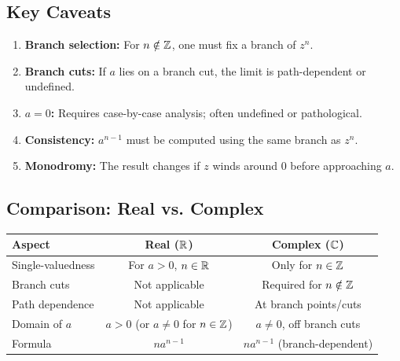 \subsection{Key Caveats}

\begin{enumerate}
    \item \textbf{Branch selection:} For $n \notin \mathbb{Z}$, one must fix a branch of $z^n$.
    \item \textbf{Branch cuts:} If $a$ lies on a branch cut, the limit is path-dependent or undefined.
    \item \textbf{$a = 0$:} Requires case-by-case analysis; often undefined or pathological.
    \item \textbf{Consistency:} $a^{n-1}$ must be computed using the same branch as $z^n$.
    \item \textbf{Monodromy:} The result changes if $z$ winds around $0$ before approaching $a$.
\end{enumerate}

\subsection{Comparison: Real vs. Complex}

\begin{center}
\renewcommand{\arraystretch}{1.4}
\begin{tabular}{|l|c|c|}
\hline
\textbf{Aspect} & \textbf{Real ($\mathbb{R}$)} & \textbf{Complex ($\mathbb{C}$)} \\
\hline
Single-valuedness & For $a > 0$, $n \in \mathbb{R}$ & Only for $n \in \mathbb{Z}$ \\
Branch cuts & Not applicable & Required for $n \notin \mathbb{Z}$ \\
Path dependence & Not applicable & At branch points/cuts \\
Domain of $a$ & $a > 0$ (or $a \neq 0$ for $n \in \mathbb{Z}$) & $a \neq 0$, off branch cuts \\
Formula & $n a^{n-1}$ & $n a^{n-1}$ (branch-dependent) \\
\hline
\end{tabular}
\end{center}

\endgroup
